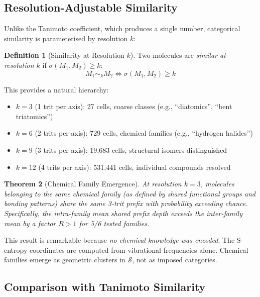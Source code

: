 \documentclass[11pt,twocolumn,a4paper]{article}
\newtheorem{theorem}{Theorem}[section]
\theoremstyle{definition}
\newtheorem{definition}[theorem]{Definition}
\theoremstyle{remark}
\newcommand{\Sspace}{\mathcal{S}}
\begin{document}
\subsection{Resolution-Adjustable Similarity}

Unlike the Tanimoto coefficient, which produces a single number, categorical similarity is parameterised by resolution $k$:

\begin{definition}[Similarity at Resolution $k$]
\label{def:sim_k}
Two molecules are \emph{similar at resolution $k$} if $\sigma(M_1, M_2) \geq k$:
\begin{equation}
M_1 \sim_k M_2 \iff \sigma(M_1, M_2) \geq k
\label{eq:sim_k}
\end{equation}
\end{definition}

This provides a natural hierarchy:
\begin{itemize}[nosep]
\item $k = 3$ (1 trit per axis): 27 cells, coarse classes (e.g., ``diatomics'', ``bent triatomics'')
\item $k = 6$ (2 trits per axis): 729 cells, chemical families (e.g., ``hydrogen halides'')
\item $k = 9$ (3 trits per axis): 19{,}683 cells, structural isomers distinguished
\item $k = 12$ (4 trits per axis): 531{,}441 cells, individual compounds resolved
\end{itemize}

\begin{theorem}[Chemical Family Emergence]
\label{thm:family_emergence}
At resolution $k = 3$, molecules belonging to the same chemical family (as defined by shared functional groups and bonding patterns) share the same 3-trit prefix with probability exceeding chance. Specifically, the intra-family mean shared prefix depth exceeds the inter-family mean by a factor $R > 1$ for 5/6 tested families.
\end{theorem}

This result is remarkable because \emph{no chemical knowledge was encoded}. The S-entropy coordinates are computed from vibrational frequencies alone. Chemical families emerge as geometric clusters in $\Sspace$, not as imposed categories.

\subsection{Comparison with Tanimoto Similarity}
\end{document}
